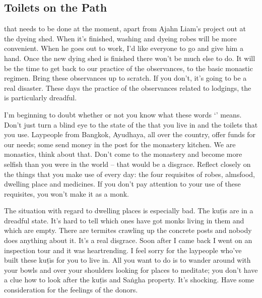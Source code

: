 \vspace*{\baselineskip}

\subsection*{Toilets on the Path}

 that needs to be done at the moment, apart from Ajahn Liam's project out at the dyeing shed. When it's finished, washing and dyeing robes will be more convenient. When he goes out to work, I'd like everyone to go and give him a hand. Once the new dying shed is finished there won't be much else to do. It will be the time to get back to our practice of the observances, to the basic monastic regimen. Bring these observances up to scratch. If you don't, it's going to be a real disaster. These days the practice of the observances related to lodgings, the  is particularly dreadful.

I'm beginning to doubt whether or not you know what these words `' means. Don't just turn a blind eye to the state of the  that you live in and the toilets that you use. Laypeople from Bangkok, Ayudhaya, all over the country, offer funds for our needs; some send money in the post for the monastery kitchen. We are monastics, think about that. Don't come to the monastery and become more selfish than you were in the world -- that would be a disgrace. Reflect closely on the things that you make use of every day: the four requisites of robes, almsfood, dwelling place and medicines. If you don't pay attention to your use of these requisites, you won't make it as a monk.

The situation with regard to dwelling places is especially bad. The ku\d{t}\={\i}s are in a dreadful state. It's hard to tell which ones have got monks living in them and which are empty. There are termites crawling up the concrete posts and nobody does anything about it. It's a real disgrace. Soon after I came back I went on an inspection tour and it was heartrending. I feel sorry for the laypeople who've built these ku\d{t}\={\i}s for you to live in. All you want to do is to wander around with your bowls and  over your shoulders looking for places to meditate; you don't have a clue how to look after the ku\d{t}\={\i}s and Sa\.ngha property. It's shocking. Have some consideration for the feelings of the donors.

